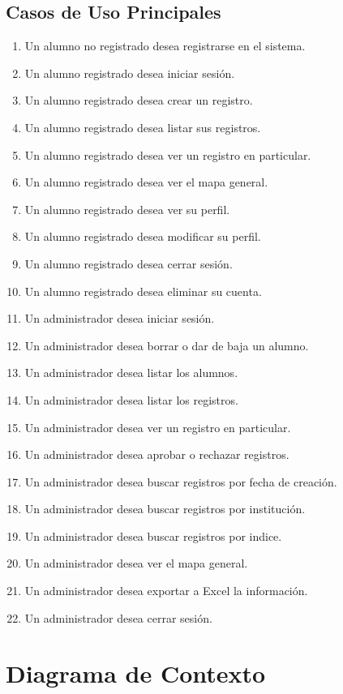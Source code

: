 \subsection{Casos de Uso Principales}

\begin{enumerate}[CU1: ]
    \itemsep-1em
    \item Un alumno no registrado desea registrarse en el sistema.
    \item Un alumno registrado desea iniciar sesión.
    \item Un alumno registrado desea crear un registro.
    \item Un alumno registrado desea listar sus registros.
    \item Un alumno registrado desea ver un registro en particular.
    \item Un alumno registrado desea ver el mapa general.
    \item Un alumno registrado desea ver su perfil.
    \item Un alumno registrado desea modificar su perfil.
    \item Un alumno registrado desea cerrar sesión.
    \item Un alumno registrado desea eliminar su cuenta.
    \item Un administrador desea iniciar sesión.
    \item Un administrador desea borrar o dar de baja un alumno.
    \item Un administrador desea listar los alumnos.
    \item Un administrador desea listar los registros.
    \item Un administrador desea ver un registro en particular.
    \item Un administrador desea aprobar o rechazar registros.
    \item Un administrador desea buscar registros por fecha de creación.
    \item Un administrador desea buscar registros por institución.
    \item Un administrador desea buscar registros por indice.
    \item Un administrador desea ver el mapa general.
    \item Un administrador desea exportar a Excel la información.
    \item Un administrador desea cerrar sesión.
\end{enumerate}

\section{Diagrama de Contexto}

